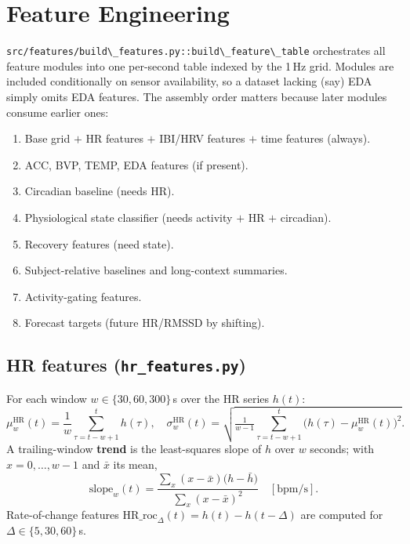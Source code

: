 \documentclass[11pt,a4paper]{article}
\newcommand{\code}[1]{\lstinline[basicstyle=\ttfamily\normalsize]!#1!}
\begin{document}
\section{Feature Engineering}\label{sec:features}

\code{src/features/build\_features.py::build\_feature\_table} orchestrates all
feature modules into one per-second table indexed by the 1\,Hz grid. Modules are
included conditionally on sensor availability, so a dataset lacking (say) EDA
simply omits EDA features. The assembly order matters because later modules
consume earlier ones:

\begin{enumerate}[leftmargin=1.4em,itemsep=1pt]
\item Base grid $+$ HR features $+$ IBI/HRV features $+$ time features (always).
\item ACC, BVP, TEMP, EDA features (if present).
\item Circadian baseline (needs HR).
\item Physiological state classifier (needs activity $+$ HR $+$ circadian).
\item Recovery features (need state).
\item Subject-relative baselines and long-context summaries.
\item Activity-gating features.
\item Forecast targets (future HR/RMSSD by shifting).
\end{enumerate}

\subsection{HR features (\texttt{hr\_features.py})}
For each window $w \in \{30, 60, 300\}$\,s over the HR series $h(t)$:
\[
\mu^{\text{HR}}_w(t)=\frac{1}{w}\!\!\sum_{\tau=t-w+1}^{t}\!\! h(\tau),\quad
\sigma^{\text{HR}}_w(t)=\sqrt{\tfrac{1}{w-1}\!\!\sum_{\tau=t-w+1}^{t}\!\!\big(h(\tau)-\mu^{\text{HR}}_w(t)\big)^2}.
\]
A trailing-window \textbf{trend} is the least-squares slope of $h$ over $w$
seconds; with $x=0,\dots,w-1$ and $\bar x$ its mean,
\[
\text{slope}_w(t)=\frac{\sum_x (x-\bar x)\big(h-\bar h\big)}{\sum_x (x-\bar x)^2}
\quad[\text{bpm/s}].
\]
Rate-of-change features $\text{HR\_roc}_\Delta(t)=h(t)-h(t-\Delta)$ are computed
for $\Delta \in \{5, 30, 60\}$\,s.
\end{document}
